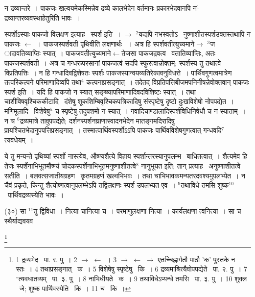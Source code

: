 \documentclass[11pt, openany]{book}
\newcommand\blfootnote[1]{%
 \begingroup
 \renewcommand\thefootnote{}\footnote{#1}%
 \addtocounter{footnote}{-1}%
 \endgroup
}
\begin{document}
\newpage
न द्रव्यान्तरे~। पाकजः खल्वयमेकस्मिन्नेव द्रव्ये कालभेदेन वर्तमानः प्रकारभेदवानपि न$^1$ द्रव्यान्तरव्यवस्थाहेतुरिति भावः~।

स्पर्शोऽस्याः पाकजो विलक्षण इत्याह \textendash\ {\knu स्पर्श} इति~। $\rightarrow$ ${}^2$यद्यपि नभस्वतोऽ \textendash\ नुष्णाशीतस्पर्शउक्तस्तथापि न पाकजः $\leftarrow$~। पाकजस्पर्शवती पृथिवीति लक्षणार्थः ~। अत्र हि स्पर्शवतीत्युच्यमाने$\rightarrow$ $^3$ज ादावतिव्याप्तिः स्यात्~। पाकजवतीत्युच्यमाने$\leftarrow$तेजसा पाकजद्रवत्व \textendash\ वतातिव्याप्तिः, अतः पाकजस्पर्शवती~। अत्र च गन्धरूपरसानां पाकजत्वं सदपि स्फुरत्वान्नोक्तम्; स्पर्शस्य तु तथात्वे विप्रतिपत्तिः~। न हि गन्धादिवद्विशेषतः स्पर्शः पाकजस्यान्वयव्यतिरेकावनुविधत्ते~। पार्थिवगुणत्वमात्रेण तत्परिकल्पने परिमाणादिष्वपि तथा$^4$ कल्पनाप्रसङ्गात्~। तदेतद् विप्रतिपत्तिबीजमपनिनीषन्नेवोक्तवान् पाकजः स्पर्श इति~। यदि हि पाकजो न स्यात् सङ्ख्यापरिमाणादिवदविशिष्टः स्यात्~। तथा चाशीविषवृश्चिककीटादि \textendash\ दंशेषु शूकशिम्बिवृश्चिकपत्रिकादिषु संस्पृष्टेषु दृष्टो दुःखविशेषो नोपपद्येत~। मणिमूलादि \textendash\ विशेषेषु$^5$ च स्पृष्टेषु तदुपशमो न स्यात्~। गवादिचाण्डालादिस्पर्शविधिनिषेधौ च न स्याताम्~। न च ${}^6$द्रव्यमात्रे तावुपपद्येते; दर्शनस्पर्शनघ्राणास्वादनभेदेन मातङ्गमदिरादिषु प्रायश्चितभेदानुपपत्तिप्रसङ्गात्~। तस्मात्पार्थिवस्पर्शोऽऽपि पाकजः पार्थिवविशेषगुणत्वात् गन्धवदि$^7$त्यवधेयम्~।

\begin{sloppypar}
ये तु मन्यन्ते पृथिव्यां स्पर्शो नास्त्येव, औष्ण्यशैत्ये विहाय स्पर्शान्तरस्यानुपलम्भ \textendash\ बाधितत्वात्~। शैत्यमेव हि तेजः स्पर्शेनाभिभूतमौष्ण्यं चोदकस्पर्शेनाभिभूतमनुष्णाशीतत्वे$^8$ नानुभूयत इति; तान् प्रत्याह \textendash\ {\knu अनुष्णाशीतत्वे सतीति~।} बलवत्सजातीयग्रहण  \textendash\ कृतमग्रहणं खल्वभिभवः~। तथा चाभिभावकमन्यतरदवश्यमुपलभ्येत~। न चैवं प्रकृते, किन्तु शैत्योष्णत्वानुपलम्भेऽपि तद्विलक्षणः स्पर्श उपलभ्यत एव~। ${}^9$तथाविधे तमसि शुष्क$^10$ \textendash\ पार्थिवद्रव्यस्येति भावः~।
\end{sloppypar}

\hangindent=2cm {\knu (३०) सा ${}^11$तु द्विविधा~। नित्या चानित्या च~। परमाणुलक्षणा नित्या~। कार्यलक्षणा त्वनित्या~। सा च स्थैर्याद्यवयव \textendash\ }

\blfootnote{1 द्रव्यभेद  \textendash\ पा. र. पु~। 2 $\rightarrow$ $\leftarrow$~। 3 $\rightarrow$ $\leftarrow$ $\rightarrow$ एतच्चिह्नार्गतौ पाठौ 'क' पुस्तके न स्तः~। 4 तथाप्रसङ्गात् \textendash\ क~। 5 विशेषेषु स्पृष्टेषु \textendash\ कि~। 6 द्रव्यमाश्रित्यैवोपपद्येते  \textendash\ पा. २. पु~। 7 ${}^\circ$त्यवधातव्यम्  \textendash\ पा. ३. पु~। 8 नाभिधीयते  \textendash\ क~। 9 तथाविधेऽप्यन्धे तमसि  \textendash\ पा. ३. पु~। 10 शुक्ल  \textendash\ जे; शुष्क पार्थिवस्येति  \textendash\ कि~। 11 च  \textendash\ कि~।}
\end{document}
